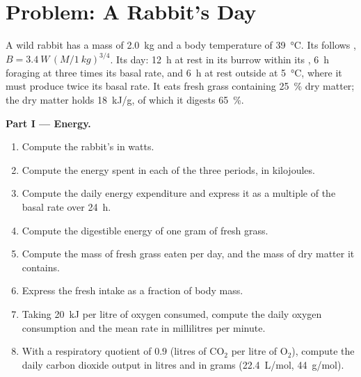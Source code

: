 \section{Problem: A Rabbit's Day}

\begin{problem}
\label{pb:b1:mammal-organization:1}
A wild rabbit has a mass of \qty{2.0}{kg} and a body temperature of
\qty{39}{\celsius}. Its  follows ,
$B = \qty{3.4}{W}\,(M/\qty{1}{kg})^{3/4}$. Its day: \qty{12}{h} at rest
in its burrow within its , \qty{6}{h} foraging at
three times its basal rate, and \qty{6}{h} at rest outside at
\qty{5}{\celsius}, where it must produce twice its basal rate. It eats
fresh grass containing \qty{25}{\%} dry matter; the dry matter holds
\qty{18}{kJ/g}, of which it digests \qty{65}{\%}.

\medskip
\noindent\textbf{Part I --- Energy.}
\begin{enumerate}
  \item Compute the rabbit's  in watts.
  \item Compute the energy spent in each of the three periods, in
        kilojoules.
  \item Compute the daily energy expenditure and express it as a
        multiple of the basal rate over \qty{24}{h}.
  \item Compute the digestible energy of one gram of fresh grass.
  \item Compute the mass of fresh grass eaten per day, and the mass of
        dry matter it contains.
  \item Express the fresh intake as a fraction of body mass.
  \item Taking \qty{20}{kJ} per litre of oxygen consumed, compute the
        daily oxygen consumption and the mean rate in millilitres per
        minute.
  \item With a respiratory quotient of $0.9$ (litres of $\mathrm{CO_2}$
        per litre of $\mathrm{O_2}$), compute the daily carbon dioxide
        output in litres and in grams (\qty{22.4}{L/mol},
        \qty{44}{g/mol}).
\end{enumerate}


\end{problem}
